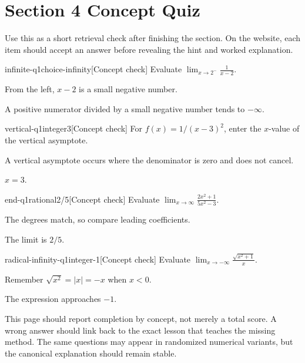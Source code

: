 \section*{Section 4 Concept Quiz}

Use this as a short retrieval check after finishing the section. On the website, each item should accept an answer before revealing the hint and worked explanation.

\begin{bgcheck}{infinite-q1}{choice}{-infinity}[Concept check]
Evaluate \(\lim_{x\to2^-}\frac1{x-2}\).
\begin{bghint}
From the left, \(x-2\) is a small negative number.
\end{bghint}
\begin{bgreveal}
A positive numerator divided by a small negative number tends to \(-\infty\).
\end{bgreveal}
\end{bgcheck}

\begin{bgcheck}{vertical-q1}{integer}{3}[Concept check]
For \(f(x)=1/(x-3)^2\), enter the \(x\)-value of the vertical asymptote.
\begin{bghint}
A vertical asymptote occurs where the denominator is zero and does not cancel.
\end{bghint}
\begin{bgreveal}
\(x=3\).
\end{bgreveal}
\end{bgcheck}

\begin{bgcheck}{end-q1}{rational}{2/5}[Concept check]
Evaluate \(\lim_{x\to\infty}\frac{2x^2+1}{5x^2-3}\).
\begin{bghint}
The degrees match, so compare leading coefficients.
\end{bghint}
\begin{bgreveal}
The limit is \(2/5\).
\end{bgreveal}
\end{bgcheck}

\begin{bgcheck}{radical-infinity-q1}{integer}{-1}[Concept check]
Evaluate \(\lim_{x\to-\infty}\frac{\sqrt{x^2+1}}x\).
\begin{bghint}
Remember \(\sqrt{x^2}=|x|=-x\) when \(x<0\).
\end{bghint}
\begin{bgreveal}
The expression approaches \(-1\).
\end{bgreveal}
\end{bgcheck}

\begin{bgsummary}[title={Quiz use on the website}]
This page should report completion by concept, not merely a total score. A wrong answer should link back to the exact lesson that teaches the missing method. The same questions may appear in randomized numerical variants, but the canonical explanation should remain stable.
\end{bgsummary}
